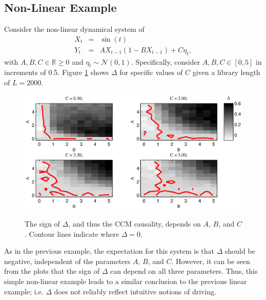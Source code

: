 \documentclass[twocolumn,aps,pre,groupedaddress]{revtex4-1}
\begin{document}
\subsection{Non-Linear Example}
Consider the non-linear dynamical system of
\begin{eqnarray}
\label{eqn:nonlinearEX}
X_t &=& \sin(t)\\
Y_t &=& AX_{t-1}\left(1-BX_{t-1}\right)+C\eta_t,
\end{eqnarray}
with $A,B,C\in\mathbb{R}\ge 0$ and $\eta_t\sim\mathcal{N}\left(0,1\right)$.  Specifically, consider $A,B,C\in[0,5]$ in increments of 0.5.  Figure \ref{fig:nonlinearex} shows $\Delta$ for specific values of $C$ given a library length of $L=2000$.
\begin{figure}[ht]
\includegraphics[scale=0.5]{NonLinearEx.eps} \\
\caption{The sign of $\Delta$, and thus the CCM causality, depends on $A$, $B$, and $C$. Contour lines indicate where $\Delta=0$.}
\label{fig:nonlinearex}
\end{figure}
As in the previous example, the expectation for this system is that $\Delta$ should be negative, independent of the parameters $A$, $B$, and $C$.  However, it can be seen from the plots that the sign of $\Delta$ can depend on all three parameters.  Thus, this simple non-linear example leads to a similar conclusion to the previous linear example; i.e. $\Delta$ does not reliably reflect intuitive notions of driving.
\end{document}
